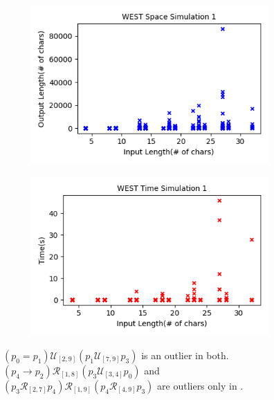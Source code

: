 \documentclass[runningheads]{llncs}
\begin{document}
\begin{figure}[H]
\captionsetup[subfigure]{aboveskip=-1pt,belowskip=-1pt}
    \centering
    \begin{subfigure}[h]{0.49\textwidth}
    \centering
    \includegraphics[width=\textwidth]{images/WESTspace1.png}
    \caption{}
    \label{InVsOutputLen1}
    \end{subfigure}
    \begin{subfigure}[h]{0.49\textwidth}
    \centering
    \includegraphics[width=\textwidth]{images/WESTtime1.png}
    \caption{}
    \label{InLenVsRunTime1}
    \end{subfigure}
    \caption{$(p_0 = p_1) \mathcal{U}_{[2,9]} (p_1 \mathcal{U}_{[7,9]} p_3)$ is an outlier in both. $(p_4 \rightarrow p_2) \mathcal{R}_{[1,8]} (p_3 \mathcal{U}_{[3,4]} p_0)$ and
    $(p_3 \mathcal{R}_{[2,7]} p_4) \mathcal{R}_{[1,9]} (p_4 \mathcal{R}_{[4,9]} p_3)$ are outliers only in .}
\end{figure}
\end{document}
